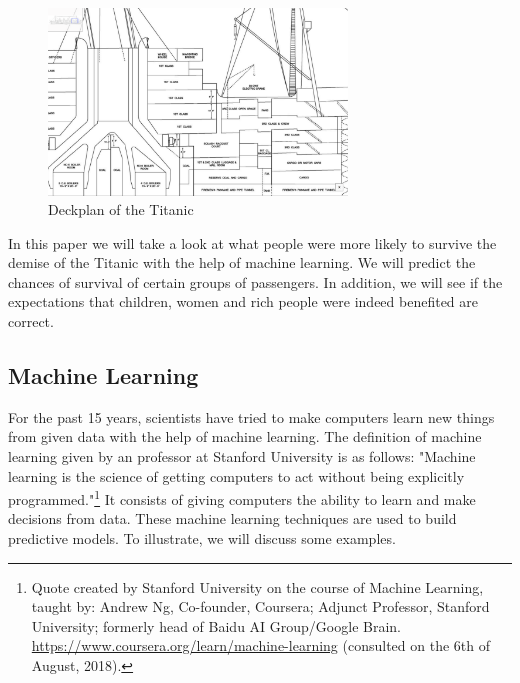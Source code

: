 \documentclass[11pt]{article}
\begin{document}
\begin{figure}[htbp]
\centering
\includegraphics[width=300px]{./Deck3.png}
\caption{\label{tab:titanicdeckplantwo}
Deckplan of the Titanic}
\end{figure} 


In this paper we will take a look at what people were more likely to survive the demise of the Titanic with the help of machine learning. We will predict the chances of survival of certain groups of passengers. In addition, we will see if the expectations that children, women and rich people were indeed benefited are correct. 

\subsection{Machine Learning}
\label{sec:orgb4ecb05}
For the past 15 years, scientists have tried to make computers learn new things from given data with the help of machine learning. The definition of machine learning given by an professor at Stanford University is as follows: "Machine learning is the science of getting computers to act without being explicitly programmed."\footnote{Quote created by Stanford University on the course of Machine Learning, taught by: Andrew Ng, Co-founder, Coursera; Adjunct Professor, Stanford University; formerly head of Baidu AI Group/Google Brain. \url{https://www.coursera.org/learn/machine-learning} (consulted on the 6th of August, 2018).} It consists of giving computers the ability to learn and make decisions from data. These machine learning techniques are used to build predictive models. To illustrate, we will discuss some examples. 
\end{document}
